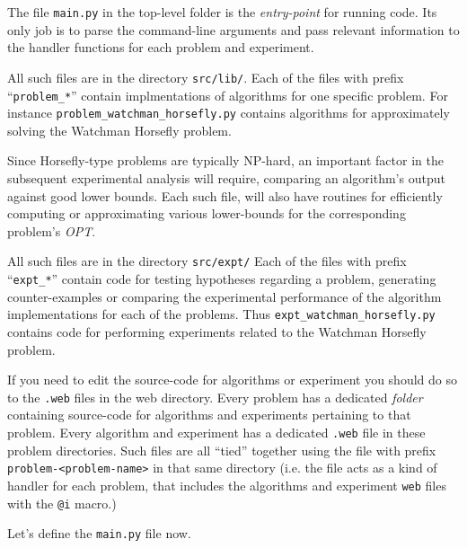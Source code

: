 \documentclass[11.5pt]{report}
\begin{document}
\newchunk 
\begin{alphalist}

\item {} The file \verb|main.py| in the top-level folder is the 
\textit{entry-point} for running code. Its only job is to parse the 
command-line arguments and pass relevant information to the handler 
functions for each problem and experiment. 

\item {} All such files are in the directory \texttt{src/lib/}.
  Each of the files with prefix ``\verb|problem_*|'' contain implmentations of 
  algorithms for one specific problem. For instance \verb|problem_watchman_horsefly.py| 
  contains algorithms for approximately solving the Watchman Horsefly problem. 
 
  Since Horsefly-type problems are typically NP-hard, an important factor in 
  the subsequent experimental analysis will require, comparing an algorithm's  
  output against good lower bounds. Each such file, will also have routines
  for efficiently computing or approximating various lower-bounds for the 
  corresponding problem's \textit{OPT}. 

\item {} All such files are in the directory \texttt{src/expt/}
 Each of the files with prefix ``\verb|expt_*|'' 
 contain code for testing hypotheses regarding a problem, generating 
 counter-examples or comparing the experimental performance of the 
 algorithm implementations for each of the problems. Thus 
 \verb|expt_watchman_horsefly.py| contains 
 code for performing experiments related to the 
 Watchman Horsefly problem. 
\end{alphalist}


If you need to edit the source-code for algorithms or experiment 
you should do so to the \texttt{.web} files in the web directory. Every problem
has a dedicated \textit{folder} containing source-code for algorithms and experiments 
pertaining to that problem. Every algorithm and experiment has a dedicated \verb|.web|
file in these problem directories. Such files are all ``tied'' together using the 
file with prefix \verb|problem-<problem-name>| in that same directory (i.e.
the file acts as a kind of handler for each problem, that includes the algorithms
and experiment \verb|web| files with the \verb|@i| macro.) 


\newchunk Let's define the \verb|main.py| file now. 
\end{document}
